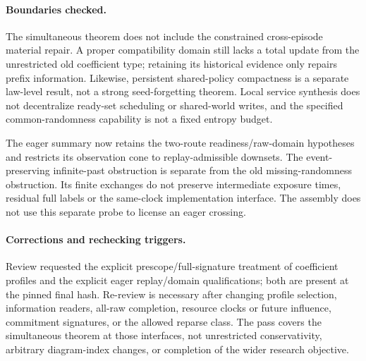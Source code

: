 \documentclass{article}
\begin{document}
\paragraph{Boundaries checked.}
The simultaneous theorem does not include the constrained cross-episode material repair. A proper compatibility domain still lacks a total update from the unrestricted old coefficient type; retaining its historical evidence only repairs prefix information. Likewise, persistent shared-policy compactness is a separate law-level result, not a strong seed-forgetting theorem. Local service synthesis does not decentralize ready-set scheduling or shared-world writes, and the specified common-randomness capability is not a fixed entropy budget.

The eager summary now retains the two-route readiness/raw-domain hypotheses and restricts its observation cone to replay-admissible downsets. The event-preserving infinite-past obstruction is separate from the old missing-randomness obstruction. Its finite exchanges do not preserve intermediate exposure times, residual full labels or the same-clock implementation interface. The assembly does not use this separate probe to license an eager crossing.

\paragraph{Corrections and rechecking triggers.}
Review requested the explicit prescope/full-signature treatment of coefficient profiles and the explicit eager replay/domain qualifications; both are present at the pinned final hash. Re-review is necessary after changing profile selection, information readers, all-raw completion, resource clocks or future influence, commitment signatures, or the allowed reparse class. The pass covers the simultaneous theorem at those interfaces, not unrestricted conservativity, arbitrary diagram-index changes, or completion of the wider research objective.
\end{document}
